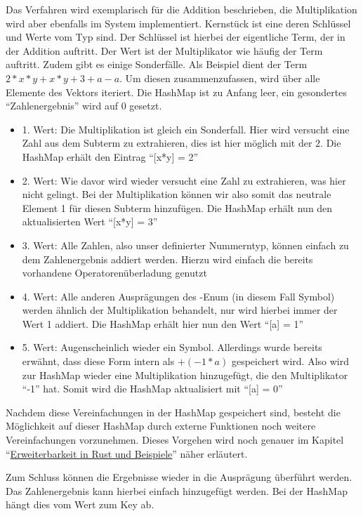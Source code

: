 \documentclass[11pt,a4paper, ngerman]{article}
\begin{document}
Das Verfahren wird exemplarisch für die Addition beschrieben, die Multiplikation wird aber ebenfalls im System implementiert. Kernstück ist eine  deren Schlüssel und Werte vom Typ  sind. Der Schlüssel ist hierbei der eigentliche Term, der in der Addition auftritt. Der Wert ist der Multiplikator wie häufig der Term auftritt. Zudem gibt es einige Sonderfälle. Als Beispiel dient der Term 
$2*x*y + x*y + 3 + a - a$. Um diesen zusammenzufassen, wird über alle Elemente des Vektors iteriert. Die HashMap ist zu Anfang leer, ein gesondertes ``Zahlenergebnis'' wird auf 0 gesetzt.

\begin{itemize}
    \item 1. Wert: Die Multiplikation ist gleich ein Sonderfall. Hier wird versucht eine Zahl aus dem Subterm zu extrahieren, dies ist hier möglich mit der $2$. Die HashMap erhält den Eintrag ``[x*y] = 2''
    \item 2. Wert: Wie davor wird wieder versucht eine Zahl zu extrahieren, was hier nicht gelingt. Bei der Multiplikation können wir also somit das neutrale Element 1 für diesen Subterm hinzufügen. Die HashMap erhält nun den aktualisierten Wert ``[x*y] = 3''
    \item 3. Wert: Alle Zahlen, also unser definierter Nummerntyp, können einfach zu dem Zahlenergebnis addiert werden. Hierzu wird einfach die bereits vorhandene Operatorenüberladung genutzt
    \item 4. Wert: Alle anderen Ausprägungen des -Enum (in diesem Fall Symbol) werden ähnlich der Multiplikation behandelt, nur wird hierbei immer der Wert 1 addiert. Die HashMap erhält hier nun den Wert ``[a] = 1''
    \item 5. Wert: Augenscheinlich wieder ein Symbol. Allerdings wurde bereits erwähnt, dass diese Form intern als $+(-1*a)$ gespeichert wird. Also wird zur HashMap wieder eine Multiplikation hinzugefügt, die den Multiplikator ``-1'' hat. Somit wird die HashMap aktualisiert mit ``[a] = 0''
\end{itemize}

Nachdem diese Vereinfachungen in der HashMap gespeichert sind, besteht die Möglichkeit auf dieser HashMap durch externe Funktionen noch weitere Vereinfachungen vorzunehmen. Dieses Vorgehen wird noch genauer im Kapitel ``\hyperref[sec:kapErRustUndBei]{Erweiterbarkeit in Rust und Beispiele}'' näher erläutert.

Zum Schluss können die Ergebnisse wieder in die Ausprägung  überführt werden. Das Zahlenergebnis kann hierbei einfach hinzugefügt werden. Bei der HashMap hängt dies vom Wert zum Key ab. 
\end{document}
